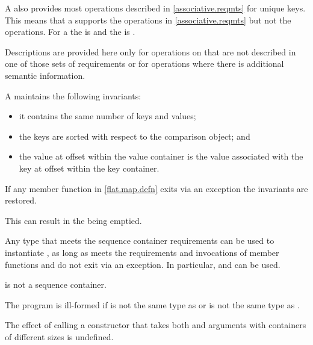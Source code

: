 \pnum
A  also provides most operations
described in \ref{associative.reqmts} for unique keys.
This means that a  supports
the  operations in \ref{associative.reqmts}
but not the  operations.
For a 
the  is  and
the  is .

\pnum
Descriptions are provided here only for operations on  that
are not described in one of those sets of requirements or for operations where
there is additional semantic information.

\pnum
A  maintains the following invariants:
\begin{itemize}
\item
it contains the same number of keys and values;
\item
the keys are sorted with respect to the comparison object; and
\item
the value at offset  within the value container is
the value associated with the key at offset 
within the key container.
\end{itemize}

\pnum
If any member function in \ref{flat.map.defn} exits via an exception
the invariants are restored.
\begin{note}
This can result in the  being emptied.
\end{note}

\pnum
Any type 
that meets the sequence container requirements
can be used to instantiate ,
as long as
 meets the  requirements and
invocations of
member functions  and  do not exit via an exception.
In particular,  and 
can be used.
\begin{note}
 is not a sequence container.
\end{note}

\pnum
The program is ill-formed if
 is not the same type as  or
 is not the same type as .

\pnum
The effect of calling a constructor
that takes
both  and  arguments with
containers of different sizes is undefined.

